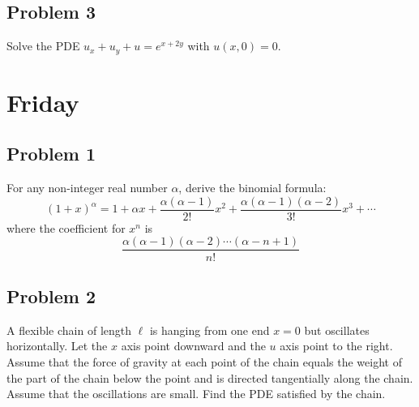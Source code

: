 \documentclass{ben}
\begin{document}
\subsection{Problem 3}
\noindent
Solve the PDE $u_x + u_y + u = e^{x + 2y}$ with $u(x, 0) = 0$.
\section{Friday}
\subsection{Problem 1}
\noindent
For any non-integer real number $\alpha$, derive the binomial formula:
\[
(1 + x)^\alpha = 1 + \alpha x + \frac{\alpha(\alpha - 1)}{2!} x^2
+ \frac{\alpha (\alpha - 1)(\alpha - 2)}{3!}x^3 + \cdots
\]
where the coefficient for $x^n$ is
\[
\frac{\alpha (\alpha - 1) (\alpha - 2) \cdots (\alpha - n + 1)}{n!}
\]
\subsection{Problem 2}
\noindent
A flexible chain of length $\ell$ is hanging from one end $x = 0$ but oscillates
horizontally. Let the $x$ axis point downward and the $u$ axis point to the right.
Assume that the force of gravity at each point of the chain equals the weight
of the part of the chain below the point and is directed tangentially along the
chain. Assume that the oscillations are small. Find the PDE satisfied by the
chain.
\end{document}
